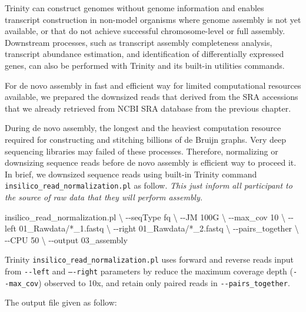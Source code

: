 \documentclass[
  letterpaper,
  DIV=11,
  numbers=noendperiod]{scrreprt}
\newenvironment{Shaded}{\begin{snugshade}}{\end{snugshade}}
\newcommand{\DataTypeTok}[1]{\textcolor[rgb]{0.68,0.00,0.00}{#1}}
\newcommand{\ExtensionTok}[1]{\textcolor[rgb]{0.00,0.23,0.31}{#1}}
\newcommand{\NormalTok}[1]{\textcolor[rgb]{0.00,0.23,0.31}{#1}}
\newcommand{\PreprocessorTok}[1]{\textcolor[rgb]{0.68,0.00,0.00}{#1}}
\begin{document}
Trinity can construct genomes without genome information and enables
transcript construction in non-model organisms where genome assembly is
not yet available, or that do not achieve successful chromosome-level or
full assembly. Downstream processes, such as transcript assembly
completeness analysis, transcript abundance estimation, and
identification of differentially expressed genes, can also be performed
with Trinity and its built-in utilities commands.

For de novo assembly in fast and efficient way for limited computational
resources available, we prepared the downsized reads that derived from
the SRA accessions that we already retrieved from NCBI SRA database from
the previous chapter.

During de novo assembly, the longest and the heaviest computation
resource required for constructing and stitching billions of de Bruijn
graphs. Very deep sequencing libraries may failed of these processes.
Therefore, normalizing or downsizing sequence reads before de novo
assembly is efficient way to proceed it. In brief, we downsized sequence
reads using built-in Trinity command
\texttt{insilico\_read\_normalization.pl} as follow. \emph{This just
inform all participant to the source of raw data that they will perform
assembly.}

\begin{Shaded}
\begin{Highlighting}[]
\ExtensionTok{insilico\_read\_normalization.pl} \DataTypeTok{\textbackslash{}}
\NormalTok{{-}{-}seqType fq }\DataTypeTok{\textbackslash{}}
\NormalTok{{-}{-}JM 100G }\DataTypeTok{\textbackslash{}}
\NormalTok{{-}{-}max\_cov 10 }\DataTypeTok{\textbackslash{}}
\NormalTok{{-}{-}left 01\_Rawdata/}\PreprocessorTok{*}\NormalTok{\_1.fastq }\DataTypeTok{\textbackslash{}}
\NormalTok{{-}{-}right 01\_Rawdata/}\PreprocessorTok{*}\NormalTok{\_2.fastq }\DataTypeTok{\textbackslash{}}
\NormalTok{{-}{-}pairs\_together }\DataTypeTok{\textbackslash{}}
\NormalTok{{-}{-}CPU 50 }\DataTypeTok{\textbackslash{}}
\NormalTok{{-}{-}output 03\_assembly}
\end{Highlighting}
\end{Shaded}

Trinity \texttt{insilico\_read\_normalization.pl} uses forward and
reverse reads input from \texttt{-\/-left} and \texttt{–-right}
parameters by reduce the maximum coverage depth (\texttt{-\/-max\_cov})
observed to 10x, and retain only paired reads in
\texttt{-\/-pairs\_together}.

The output file given as follow:
\end{document}
